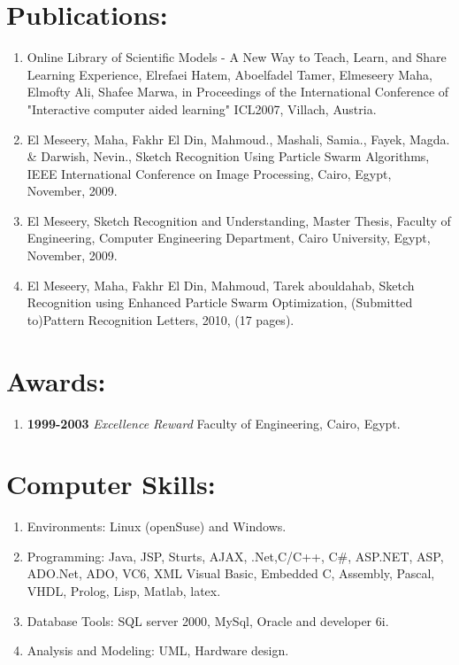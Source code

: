 \documentclass{article}
\begin{document}
 \section*{Publications:}
 \begin{enumerate}
  \item Online Library of Scientific Models - A New Way to Teach, Learn, and
Share Learning Experience, Elrefaei Hatem, Aboelfadel Tamer, Elmeseery Maha,
Elmofty Ali, Shafee Marwa, in Proceedings of the International Conference of "Interactive computer aided learning" ICL2007, Villach, Austria.\textbf{\underbar{}}
  \item El Meseery, Maha, Fakhr El Din, Mahmoud., Mashali, Samia., Fayek, Magda.
 \& Darwish, Nevin., Sketch Recognition Using Particle Swarm Algorithms,  IEEE
 International Conference on Image Processing, Cairo, Egypt, November,  2009.
  \item El Meseery, Sketch Recognition and Understanding,  Master Thesis,
  Faculty of Engineering, Computer Engineering Department, Cairo
  University, Egypt, November, 2009.
  \item El Meseery, Maha, Fakhr El Din, Mahmoud, Tarek abouldahab, Sketch
  Recognition using Enhanced Particle Swarm Optimization, (Submitted to)Pattern
  Recognition Letters, 2010, (17 pages).
\end{enumerate}
 \section*{Awards:}
  \begin{enumerate}
    \item \textbf{1999-2003} \textit{Excellence Reward} Faculty of Engineering,
    Cairo, Egypt.

  \end{enumerate}
 \section*{Computer Skills:}
 \begin{enumerate}
\item Environments: Linux (openSuse) and Windows.
 \item Programming: Java, JSP, Sturts, AJAX, .Net,C/C++, C\#,  ASP.NET, ASP, ADO.Net, ADO, VC6,  XML  Visual Basic, Embedded C, Assembly, Pascal, VHDL, Prolog, Lisp, Matlab, latex.
 \item Database Tools: SQL server 2000, MySql, Oracle and developer 6i.
 \item Analysis and Modeling: UML, Hardware design.
\end{enumerate}
\end{document}
